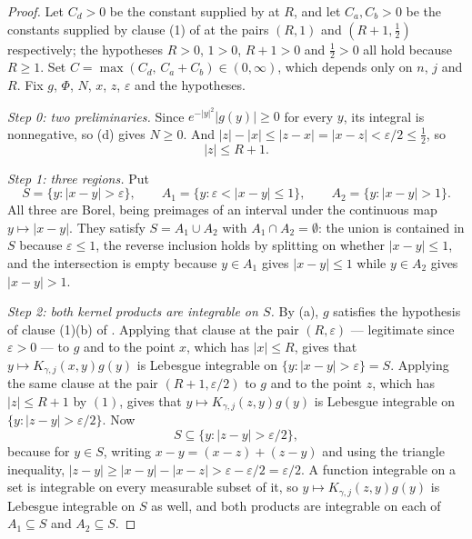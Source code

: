 \begin{proof}
Let $C_d > 0$ be the constant supplied by
 at $R$, and let $C_a, C_b > 0$ be
the constants supplied by clause (1) of  at
the pairs $(R,1)$ and $(R+1,\tfrac12)$ respectively; the hypotheses $R > 0$,
$1 > 0$, $R+1 > 0$ and $\tfrac12 > 0$ all hold because $R \geq 1$.  Set
$C = \max(C_d,\,C_a+C_b) \in (0,\infty)$, which depends only on $n$, $j$ and
$R$.  Fix $g$, $\Phi$, $N$, $x$, $z$, $\varepsilon$ and the hypotheses.

\emph{Step 0: two preliminaries.}  Since $e^{-|y|^2}|g(y)| \geq 0$ for every
$y$, its integral is nonnegative, so (d) gives $N \geq 0$.  And
$|z| - |x| \leq |z-x| = |x-z| < \varepsilon/2 \leq \tfrac12$, so
\begin{equation*}
  |z| \leq R + 1 . \tag{1}
\end{equation*}

\emph{Step 1: three regions.}  Put
\[
  S = \{y : |x-y| > \varepsilon\}, \qquad
  A_1 = \{y : \varepsilon < |x-y| \leq 1\}, \qquad
  A_2 = \{y : |x-y| > 1\} .
\]
All three are Borel, being preimages of an interval under the continuous map
$y \mapsto |x-y|$.  They satisfy $S = A_1 \cup A_2$ with $A_1 \cap A_2 =
\emptyset$: the union is contained in $S$ because $\varepsilon \leq 1$, the
reverse inclusion holds by splitting on whether $|x-y| \leq 1$, and the
intersection is empty because $y \in A_1$ gives $|x-y| \leq 1$ while $y \in A_2$
gives $|x-y| > 1$.

\emph{Step 2: both kernel products are integrable on $S$.}  By (a), $g$
satisfies the hypothesis of clause (1)(b) of
.  Applying that clause at the pair
$(R,\varepsilon)$ --- legitimate since $\varepsilon > 0$ --- to $g$ and to the
point $x$, which has $|x| \leq R$, gives that
$y \mapsto K_{\gamma,j}(x,y)g(y)$ is Lebesgue integrable on
$\{y : |x-y| > \varepsilon\} = S$.  Applying the same clause at the pair
$(R+1,\varepsilon/2)$ to $g$ and to the point $z$, which has $|z| \leq R+1$ by
$(1)$, gives that $y \mapsto K_{\gamma,j}(z,y)g(y)$ is Lebesgue integrable on
$\{y : |z-y| > \varepsilon/2\}$.  Now
\begin{equation*}
  S \subseteq \{y : |z-y| > \varepsilon/2\} , \tag{2}
\end{equation*}
because for $y \in S$, writing $x-y = (x-z)+(z-y)$ and using the triangle
inequality, $|z-y| \geq |x-y| - |x-z| > \varepsilon - \varepsilon/2 =
\varepsilon/2$.  A function integrable on a set is integrable on every
measurable subset of it, so $y \mapsto K_{\gamma,j}(z,y)g(y)$ is Lebesgue
integrable on $S$ as well, and both products are integrable on each of
$A_1 \subseteq S$ and $A_2 \subseteq S$.


\end{proof}
